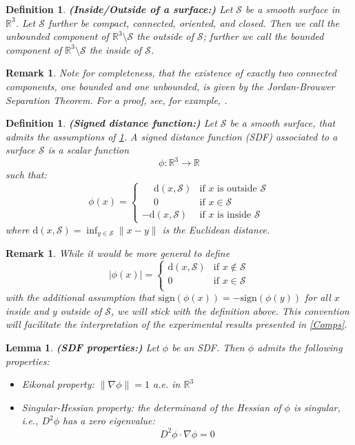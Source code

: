 \documentclass[draft,12pt,openany]{book}
\newcommand{\R}{\mathbb{R}}
\def\S{\mathcal{S}}
\theoremstyle{plainnormal}
\newtheorem{lemma}[theorem]{Lemma}
\newtheorem{definition}[theorem]{Definition}
\newtheorem{remark}[theorem]{Remark}
\theoremstyle{remark}
\begin{document}
\begin{definition}\label{defInsOuts}\textbf{(Inside/Outside of a surface:)}
    Let $\S$ be a smooth surface in $\R^3$. Let $\S$ further be compact, connected, oriented, and closed. Then we call the unbounded component of $\R^3\setminus \S$ the \emph{outside} of $\S$; further we call the bounded component of $\R^3\setminus \S$ the \emph{inside} of $\S$.
\end{definition}
\begin{remark}
    Note for completeness, that the existence of exactly two connected components, one bounded and one unbounded, is given by the \emph{Jordan-Brouwer Separation Theorem}. For a proof, see, for example, \cite{Lima01011988}. 
\end{remark}
\begin{definition}\textbf{(Signed distance function:)}
    Let $\S$ be a smooth surface, that admits the assumptions of \cref{defInsOuts}. A \emph{signed distance function} (SDF) associated to a surface $\S$ is a scalar function 
    $$\phi: \R^3 \rightarrow \R$$
    such that:
    $$\phi(x) = 
\begin{cases}
\phantom{-}\mathrm{d}(x, \S) & \text{if } x \text{ is outside } \S \\
\phantom{-} 0 & \text{if } x \in \S \\
-\mathrm{d}(x, \S) & \text{if } x \text{ is inside } \S
\end{cases} $$
    where $\mathrm{d} (x, \S)= \inf_{y\in \S} \|x - y\|$ is the Euclidean distance.
\end{definition}
    \begin{remark}
        While it would be more general to define
    $$|\phi(x)| = 
\begin{cases}
\mathrm{d}(x, \S) & \text{if } x \notin \S \\
0 & \text{if } x \in \S \\
\end{cases}$$
with the additional assumption that 
$\mathrm{sign}(\phi(x)) = - \mathrm{sign}(\phi (y))$ for all $x$ inside and $y$ outside of $\S$, we will stick with the definition above. This convention will facilitate the interpretation of the experimental results presented in \cref{Comps}.
    \end{remark}
\begin{lemma}\label{singHess} \textbf{(SDF properties:)}
    Let $\phi$ be an SDF. Then $\phi$ admits the following properties:
    \begin{itemize}
        \item \emph{Eikonal property}:  $\|\nabla \phi\| = 1 $ a.e. in $\R^3$ 
        \item \emph{Singular-Hessian property:}  the determinand of the Hessian of $\phi$ is singular, i.e.,  $D^2 \phi$ has a zero eigenvalue:
        $$D^2 \phi \cdot\nabla \phi = 0$$
    
    \end{itemize}
\end{lemma}
\end{document}
